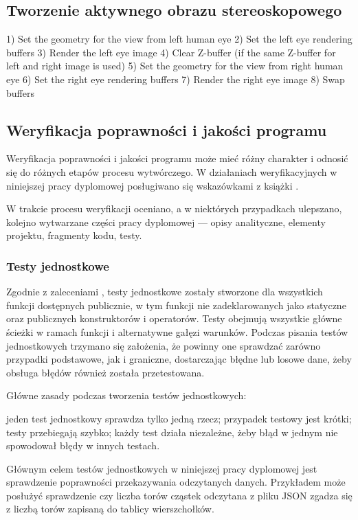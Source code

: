 \newpage
\subsection{Tworzenie aktywnego obrazu stereoskopowego} 
1) Set the geometry for the view from left human eye 
2) Set the left eye rendering buffers 
3) Render the left eye image 
4) Clear Z-buffer (if the same Z-buffer for left and right image is used) 
5) Set the geometry for the view from right human eye 
6) Set the right eye rendering buffers 
7) Render the right eye image 
8) Swap buffers

\newpage
\subsection{Weryfikacja poprawności i jakości programu}
Weryfikacja poprawności i jakości programu może mieć różny charakter i odnosić się do różnych etapów procesu wytwórczego. W działaniach weryfikacyjnych w niniejszej pracy dyplomowej posługiwano się wskazówkami z książki \cite{specyfikacja}.

W trakcie procesu weryfikacji oceniano, a w niektórych przypadkach ulepszano, kolejno wytwarzane części pracy dyplomowej --- opisy analityczne, elementy projektu, fragmenty kodu, testy. 
\subsubsection{Testy jednostkowe}
Zgodnie z zaleceniami \cite{cleanCode}, testy jednostkowe zostały stworzone dla wszystkich funkcji dostępnych publicznie, w tym funkcji nie zadeklarowanych jako statyczne oraz publicznych konstruktorów i operatorów. Testy obejmują wszystkie główne ścieżki w ramach funkcji i alternatywne gałęzi warunków. Podczas pisania testów jednostkowych trzymano się założenia, że powinny one sprawdzać zarówno przypadki podstawowe, jak i graniczne, dostarczając błędne lub losowe dane, żeby obsługa błędów również została przetestowana.

Główne zasady podczas tworzenia testów jednostkowych:
\begin{itemize}
\itemi jeden test jednostkowy sprawdza tylko jedną rzecz;
\itemi przypadek testowy jest krótki;
\itemi testy przebiegają szybko;
\itemi każdy test działa niezależne, żeby błąd w jednym nie spowodował błędy w innych testach.
\end{itemize}

Głównym celem testów jednostkowych w niniejszej pracy dyplomowej jest sprawdzenie poprawności przekazywania odczytanych danych. Przykładem może posłużyć sprawdzenie czy liczba torów cząstek odczytana z pliku JSON zgadza się z liczbą torów zapisaną do tablicy wierszchołków.

